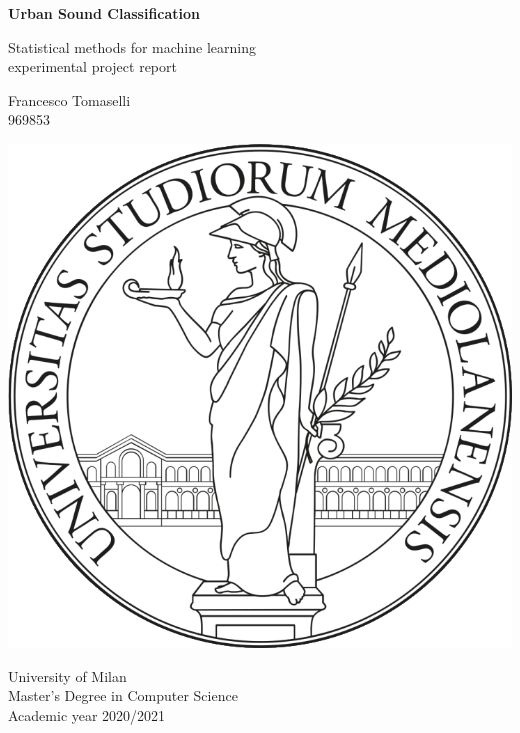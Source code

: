 \begin{titlepage}
    \begin{center}
        \vspace*{2cm}

        \Large
        \textbf{Urban Sound Classification}

        \vspace{0.5cm}
        \large
        Statistical methods for machine learning\\ experimental 
        project report
        \vspace{1.5cm}
        
        Francesco Tomaselli\\
        \small
        969853
        \vspace{.5cm}

        \vfill     
        \includegraphics[width=.3\textwidth]{images/logo}
        \vspace*{1cm}

        \normalsize             
        University of Milan\\
        Master's Degree in Computer Science\\
        Academic year 2020/2021
             
    \end{center}
 \end{titlepage}